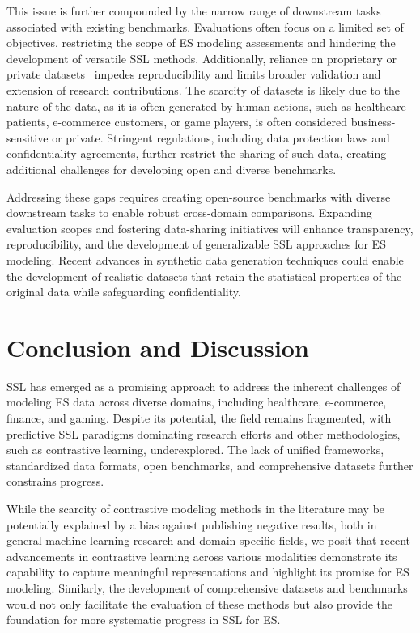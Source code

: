 \documentclass[twoside,11pt]{article}
\begin{document}
This issue is further compounded by the narrow range of downstream tasks associated with existing benchmarks. Evaluations often focus on a limited set of objectives, restricting the scope of ES modeling assessments and hindering the development of versatile SSL methods. Additionally, reliance on proprietary or private datasets~ impedes reproducibility and limits broader validation and extension of research contributions. The scarcity of datasets is likely due to the nature of the data, as it is often generated by human actions, such as healthcare patients, e-commerce customers, or game players, is often considered business-sensitive or private. Stringent regulations, including data protection laws and confidentiality agreements, further restrict the sharing of such data, creating additional challenges for developing open and diverse benchmarks.

Addressing these gaps requires creating open-source benchmarks with diverse downstream tasks to enable robust cross-domain comparisons. Expanding evaluation scopes and fostering data-sharing initiatives will enhance transparency, reproducibility, and the development of generalizable SSL approaches for ES modeling. Recent advances in synthetic data generation techniques could enable the development of realistic datasets that retain the statistical properties of the original data while safeguarding confidentiality.


\section{Conclusion and Discussion}
\label{sec:conclusion}

SSL has emerged as a promising approach to address the inherent challenges of modeling ES data across diverse domains, including healthcare, e-commerce, finance, and gaming. Despite its potential, the field remains fragmented, with predictive SSL paradigms dominating research efforts and other methodologies, such as contrastive learning, underexplored. The lack of unified frameworks, standardized data formats, open benchmarks, and comprehensive datasets further constrains progress.

While the scarcity of contrastive modeling methods in the literature may be potentially explained by a bias against publishing negative results, both in general machine learning research and domain-specific fields, we posit that recent advancements in contrastive learning across various modalities demonstrate its capability to capture meaningful representations and highlight its promise for ES modeling. Similarly, the development of comprehensive datasets and benchmarks would not only facilitate the evaluation of these methods but also provide the foundation for more systematic progress in SSL for ES.
\end{document}
